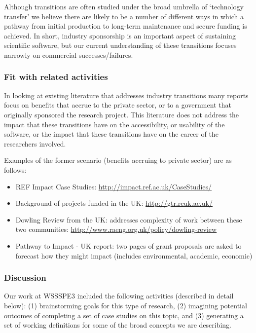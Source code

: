 Although transitions are often studied under the broad umbrella of `technology transfer' we believe there are likely to be a number of different ways in which a pathway from initial production to long-term maintenance and secure funding is achieved. In short, industry sponsorship is an important aspect of sustaining scientific software, but our current understanding of these transitions focuses narrowly on commercial successes\slash failures.

\subsubsection{Fit with related activities}

In looking at existing literature that addresses industry transitions many reports focus on benefits that accrue to the private sector, or to a government that originally sponsored the research project.
This literature does not address the impact that these transitions have on the accessibility, or usability of the software, or the impact that these transitions have on the career of the researchers involved. 

Examples of the former scenario (benefits accruing to private sector) are as follows:
\begin{itemize}
\item REF Impact Case Studies: \url{http://impact.ref.ac.uk/CaseStudies/}
\item Background of projects funded in the UK: \url{http://gtr.rcuk.ac.uk/}
\item Dowling Review from the UK: addresses complexity of work between these two communities: \url{http://www.raeng.org.uk/policy/dowling-review}
\item Pathway to Impact - UK report: two pages of grant proposals are asked to forecast how they might impact (includes environmental, academic, economic)
\end{itemize}

\subsubsection{Discussion}

Our work at WSSSPE3 included the following activities (described in detail below): (1) brainstorming goals for this type of research, (2) imagining potential outcomes of completing a set of case studies on this topic, and (3) generating a set of working definitions for some of the broad concepts we are describing. 

